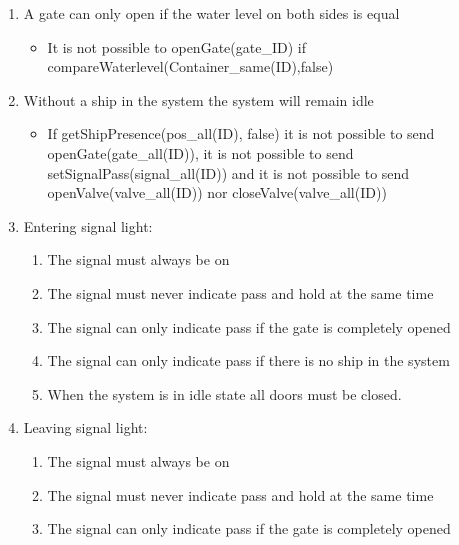 \begin{enumerate}
	\item A gate can only open if the water level on both sides is equal
	\begin{itemize}
		\item It is not possible to openGate(gate\_ID) if compareWaterlevel(Container\_same(ID),false)

	\end{itemize}
	
	\item Without a ship in the system the system will remain idle
	\begin{itemize}
		\item If getShipPresence(pos\_all(ID), false) it is not possible to send openGate(gate\_all(ID)), it is not possible to send setSignalPass(signal\_all(ID)) and it is not possible to send openValve(valve\_all(ID)) nor closeValve(valve\_all(ID))
		
		
	\end{itemize}
	
	
	\item Entering signal light:
		\begin{enumerate}
			\item The signal must always be on
			\item The signal must never indicate pass and hold at the same time
			\item The signal can only indicate pass if the gate is completely opened
			\item The signal can only indicate pass if there is no ship in the system
			\item When the system is in idle state all doors must be closed.
			
		\end{enumerate}
	\item Leaving signal light:
		\begin{enumerate}
			\item The signal must always be on
			\item The signal must never indicate pass and hold at the same time
			\item The signal can only indicate pass if the gate is completely opened
		\end{enumerate}
\end{enumerate}
